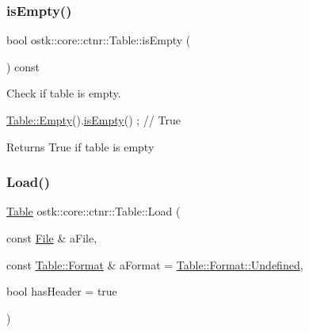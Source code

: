 \subsubsection{\texorpdfstring{is\+Empty()}{isEmpty()}}
{\footnotesize\ttfamily bool ostk\+::core\+::ctnr\+::\+Table\+::is\+Empty (\begin{DoxyParamCaption}{ }\end{DoxyParamCaption}) const}



Check if table is empty. 


\begin{DoxyCode}
\hyperlink{classostk_1_1core_1_1ctnr_1_1_table_af7ec9c84859ac8809021556c1c26dd8b}{Table::Empty}().\hyperlink{classostk_1_1core_1_1ctnr_1_1_table_a8e56fe6a310edb33ea1cbc69c2609ee0}{isEmpty}() ; \textcolor{comment}{// True}
\end{DoxyCode}


\begin{DoxyReturn}{Returns}
True if table is empty 
\end{DoxyReturn}
\mbox{\label{classostk_1_1core_1_1ctnr_1_1_table_a0bf37edce9a3680aad444469f813a099}} 
\subsubsection{\texorpdfstring{Load()}{Load()}}
{\footnotesize\ttfamily \hyperlink{classostk_1_1core_1_1ctnr_1_1_table}{Table} ostk\+::core\+::ctnr\+::\+Table\+::\+Load (\begin{DoxyParamCaption}\item[{const \hyperlink{classostk_1_1core_1_1fs_1_1_file}{File} \&}]{a\+File,  }\item[{const \hyperlink{classostk_1_1core_1_1ctnr_1_1_table_aacb867db63d74cac28a388029bf161d2}{Table\+::\+Format} \&}]{a\+Format = {\ttfamily \hyperlink{classostk_1_1core_1_1ctnr_1_1_table_aacb867db63d74cac28a388029bf161d2aec0fc0100c4fc1ce4eea230c3dc10360}{Table\+::\+Format\+::\+Undefined}},  }\item[{bool}]{has\+Header = {\ttfamily true} }\end{DoxyParamCaption})\hspace{0.3cm}{\ttfamily [static]}}



